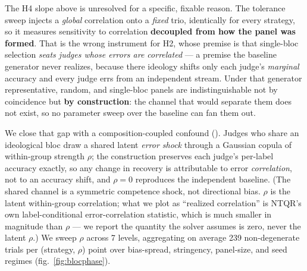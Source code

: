 \documentclass[
]{article}
\begin{document}
The H4 slope above is unresolved for a specific, fixable reason. The
tolerance sweep injects a \emph{global} correlation onto a \emph{fixed}
trio, identically for every strategy, so it measures sensitivity to
correlation \textbf{decoupled from how the panel was formed}. That is
the wrong instrument for H2, whose premise is that single-bloc selection
\emph{seats judges whose errors are correlated} --- a premise the
baseline generator never realizes, because there ideology shifts only
each judge's \emph{marginal} accuracy and every judge errs from an
independent stream. Under that generator representative, random, and
single-bloc panels are indistinguishable not by coincidence but
\textbf{by construction}: the channel that would separate them does not
exist, so no parameter sweep over the baseline can fan them out.

We close that gap with a composition-coupled confound
(). Judges who share an
ideological bloc draw a shared latent \emph{error shock} through a
Gaussian copula of within-group strength \(\rho\); the construction
preserves each judge's per-label accuracy exactly, so any change in
recovery is attributable to error \emph{correlation}, not to an accuracy
shift, and \(\rho=0\) reproduces the independent baseline. (The shared
channel is a symmetric competence shock, not directional bias. \(\rho\)
is the latent within-group correlation; what we plot as ``realized
correlation'' is NTQR's own label-conditional error-correlation
statistic, which is much smaller in magnitude than \(\rho\) --- we
report the quantity the solver assumes is zero, never the latent
\(\rho\).) We sweep \(\rho\) across 7 levels, aggregating on average 239
non-degenerate trials per (strategy, \(\rho\)) point over bias-spread,
stringency, panel-size, and seed regimes (fig.~\ref{fig:blocphase}).
\end{document}
